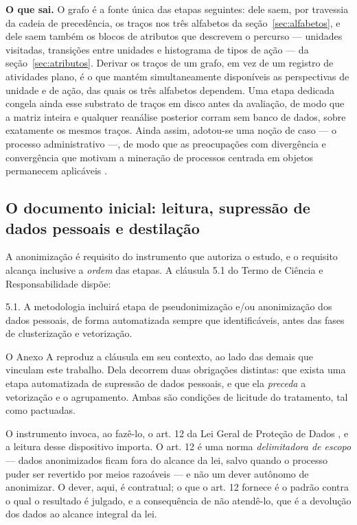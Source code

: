 \textbf{O que sai.} O grafo é a fonte única das etapas seguintes: dele saem, por travessia da
cadeia de precedência, os traços nos três alfabetos da seção~\ref{sec:alfabetos}, e dele saem também
os blocos de atributos que descrevem o percurso --- unidades visitadas, transições entre unidades e
histograma de tipos de ação --- da seção~\ref{sec:atributos}. Derivar os traços de um grafo, em vez
de um registro de atividades plano, é o que mantém simultaneamente disponíveis as perspectivas de
unidade e de ação, das quais os três alfabetos dependem. Uma etapa dedicada congela ainda esse
substrato de traços em disco antes da avaliação, de modo que a matriz inteira e qualquer
reanálise posterior corram sem banco de dados, sobre exatamente os mesmos traços. Ainda assim,
adotou-se uma noção de caso
--- o processo administrativo ---, de modo que as preocupações com divergência e convergência que
motivam a mineração de processos centrada em objetos permanecem aplicáveis
\cite{vanderaalst2019ocpm}.

\subsection{O documento inicial: leitura, supressão de dados pessoais e destilação}\label{sec:documento}

A anonimização é requisito do instrumento que autoriza o estudo, e o requisito alcança inclusive a
\emph{ordem} das etapas. A cláusula 5.1 do Termo de
Ciência e Responsabilidade \cite{seadpi2026termo} dispõe:

\begin{citacao}
5.1. A metodologia incluirá etapa de pseudonimização e/ou anonimização dos dados pessoais, de
forma automatizada sempre que identificáveis, antes das fases de clusterização e vetorização.
\end{citacao}

O Anexo A reproduz a cláusula em seu contexto, ao lado das demais que vinculam este trabalho. Dela
decorrem duas obrigações distintas: que exista uma etapa automatizada de supressão de dados
pessoais, e que ela \emph{preceda} a vetorização e o agrupamento. Ambas são condições de licitude
do tratamento, tal como pactuadas.

O instrumento invoca, ao fazê-lo, o art. 12 da Lei Geral de Proteção de Dados
\cite{brasil2018lgpd}, e a leitura desse dispositivo importa. O art. 12 é uma norma
\emph{delimitadora de escopo} --- dados anonimizados ficam fora do alcance da lei, salvo quando o
processo puder ser revertido por meios razoáveis --- e não um dever autônomo de anonimizar. O dever,
aqui, é contratual; o que o art. 12 fornece é o padrão contra o qual o resultado é julgado, e a
consequência de não atendê-lo, que é a devolução dos dados ao alcance integral da lei.

